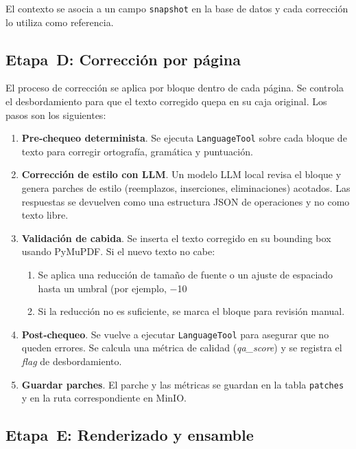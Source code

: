 \documentclass[12pt]{article}
\begin{document}
El contexto se asocia a un campo \texttt{snapshot} en la base de datos y cada corrección lo utiliza
como referencia.

\subsection{Etapa D: Corrección por página}

El proceso de corrección se aplica por bloque dentro de cada página.  Se controla el desbordamiento
para que el texto corregido quepa en su caja original.  Los pasos son los siguientes:

\begin{enumerate}[label=\arabic*.]
  \item \textbf{Pre‑chequeo determinista}.  Se ejecuta \texttt{LanguageTool} sobre cada bloque
        de texto para corregir ortografía, gramática y puntuación.
  \item \textbf{Corrección de estilo con LLM}.  Un modelo LLM local revisa el bloque y genera
        parches de estilo (reemplazos, inserciones, eliminaciones) acotados.  Las respuestas
        se devuelven como una estructura JSON de operaciones y no como texto libre.
  \item \textbf{Validación de cabida}.  Se inserta el texto corregido en su bounding box usando
        PyMuPDF.  Si el nuevo texto no cabe:
    \begin{enumerate}[label=\alph*.]
      \item Se aplica una reducción de tamaño de fuente o un ajuste de espaciado hasta un
            umbral (por ejemplo, −10 %
      \item Si la reducción no es suficiente, se marca el bloque para revisión manual.
    \end{enumerate}
  \item \textbf{Post‑chequeo}.  Se vuelve a ejecutar \texttt{LanguageTool} para asegurar que no
        queden errores.  Se calcula una métrica de calidad (\textit{qa\_score}) y se registra el
        \emph{flag} de desbordamiento.
  \item \textbf{Guardar parches}.  El parche y las métricas se guardan en la tabla
        \texttt{patches} y en la ruta correspondiente en MinIO.
\end{enumerate}

\subsection{Etapa E: Renderizado y ensamble}
\end{document}

